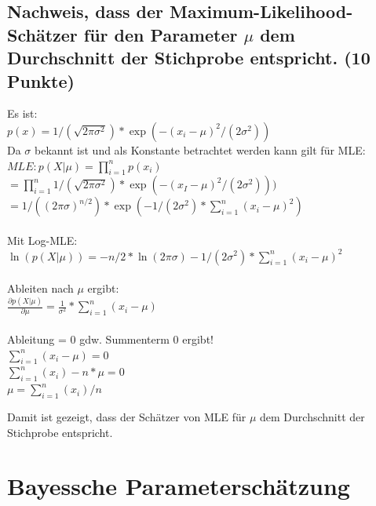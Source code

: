 \documentclass{scrartcl}
\begin{document}
\subsection*{Nachweis, dass der Maximum-Likelihood-Schätzer für den Parameter $\mu$ dem Durchschnitt der Stichprobe entspricht. (10 Punkte)}
Es ist:\\
$p(x)=1/(\sqrt{2\pi \sigma^2})* \exp(-(x_i-\mu)^2/(2\sigma^2))$\\
Da $\sigma$ bekannt ist und als Konstante betrachtet werden kann gilt für MLE:\\
$MLE: p(X|\mu)=\prod_{i=1}^{n}p(x_i) $\\
$=\prod_{i=1}^{n}1/(\sqrt{2\pi \sigma^2})*\exp(-(x_I-\mu)^2/(2\sigma^2))) $\\
$= 1/((2\pi \sigma)^{n/2})* \exp(-1/(2\sigma^2)*\sum_{i=1}^{n}(x_i-\mu)^2)$\\\\
Mit Log-MLE:\\
$\ln(p(X|\mu))= -n/2*\ln(2\pi \sigma) - 1/(2\sigma^2)*\sum_{i=1}^{n}(x_i-\mu)^2$\\\\
Ableiten nach $\mu$ ergibt:\\
$\frac{\partial p(X|\mu)}{\partial \mu} = \frac{1}{\sigma^2}*\sum_{i=1}^{n}(x_i-\mu)$\\\\
Ableitung = 0 gdw. Summenterm 0 ergibt!\\
$\sum_{i=1}^{n}(x_i-\mu) = 0$\\
$\sum_{i=1}^{n}(x_i)-n*\mu = 0$\\
$\mu = \sum_{i=1}^{n}(x_i) / n$

Damit ist gezeigt, dass der Schätzer von MLE für $\mu$ dem Durchschnitt der Stichprobe entspricht.
 

\section{Bayessche Parameterschätzung}
\end{document}
